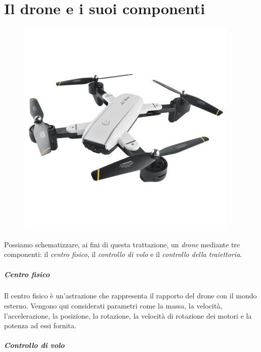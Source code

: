 \documentclass[11pt,a4paper]{report}
\newcommand{\emptypage}[0]{\afterpage{\null\newpage}}
\begin{document}

\emptypage

\chapter{Il drone e i suoi componenti}

\begin{figure}[H]
\centering
\includegraphics[scale=0.5]{drone.jpg}
\end{figure}

Possiamo schematizzare, ai fini di questa trattazione, un \textit{drone} mediante tre componenti: il \textit{centro fisico}, il \textit{controllo di volo} e il \textit{controllo della traiettoria}.



\paragraph{Centro fisico}

Il centro fisico è un'astrazione che rappresenta il rapporto del drone con il mondo esterno. Vengono qui considerati parametri come la massa, la velocità, l'accelerazione, la posizione, la rotazione, la velocità di rotazione dei motori e la potenza ad essi fornita.

\paragraph{Controllo di volo}
\end{document}
